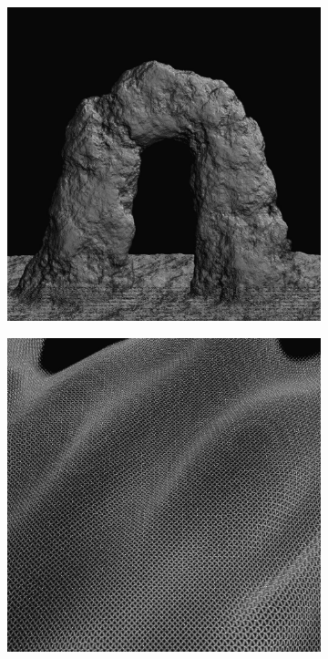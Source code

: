 \begin{figure}
	\begin{subfigure}[b]{.32\textwidth}
		\includegraphics[width=1.0\textwidth]{graphics/df/hypertexture1}
	\end{subfigure}
	\begin{subfigure}[b]{.32\textwidth}
		\includegraphics[width=1.0\textwidth]{graphics/df/hypertexture2}

\end{subfigure}
\end{figure}

